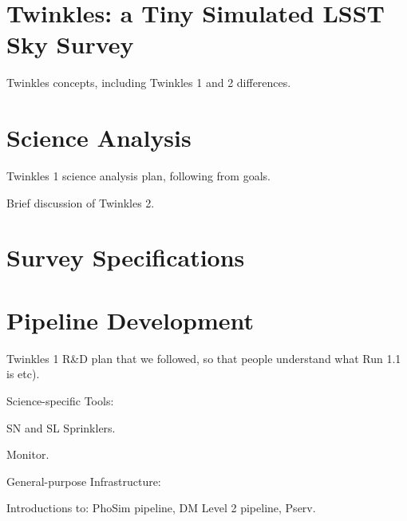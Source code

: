 \documentclass[\docopts]{\docclass}
\begin{document}

\section{Twinkles: a Tiny Simulated LSST Sky Survey}
\label{sec:concepts}

Twinkles concepts, including Twinkles 1 and 2 differences.



\section{Science Analysis}
\label{sec:science}

Twinkles 1 science analysis plan, following from goals.

Brief discussion of Twinkles 2.





\section{Survey Specifications}
\label{sec:survey}



\section{Pipeline Development}
\label{sec:pipeline}

Twinkles 1 R\&D plan that we followed, so that people understand what Run 1.1 is etc).



Science-specific Tools:

SN and SL Sprinklers.

Monitor.




General-purpose Infrastructure:

Introductions to: PhoSim pipeline, DM Level 2 pipeline, Pserv.


\end{document}
